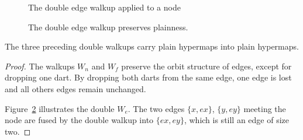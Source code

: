 \begin{figure}[htb]
\centering
{}
\caption{The double edge walkup applied to a node}
\label{fig:doubleedge}
\end{figure}

\begin{figure}[htb]
\centering
{}
\caption{The double edge walkup preserves plainness.}
\label{fig:doubleplain}
\end{figure}


\begin{lemma}  
The three preceding double walkups carry plain
hypermaps into plain hypermaps.
\end{lemma}
%

\begin{proof} The walkups $W_n$ and $W_f$ preserve the orbit structure
of edges, except for dropping one dart.  By dropping both darts from
the same edge, one edge is lost and all others edges remain
unchanged.

Figure~\ref{fig:doubleplain} illustrates the double $W_e$.  The two
edges $\{x,e x\}$, $\{y, e y\}$ meeting the node are fused by the
double walkup into $\{e x, e y\}$, which is still an edge of size
two.
\end{proof}

